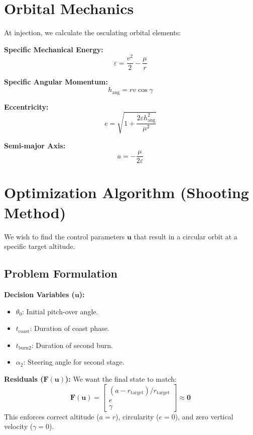 \documentclass[11pt]{article}
\begin{document}
\section{Orbital Mechanics}
\label{sec:orbit}
At injection, we calculate the osculating orbital elements:

\textbf{Specific Mechanical Energy:}
\begin{equation}
    \label{eq:energy}
    \varepsilon = \frac{v^2}{2} - \frac{\mu}{r}
\end{equation}

\textbf{Specific Angular Momentum:}
\begin{equation}
    \label{eq:ang_mom}
    h_{\text{ang}} = r v \cos\gamma
\end{equation}

\textbf{Eccentricity:}
\begin{equation}
    \label{eq:eccentricity}
    e = \sqrt{1 + \frac{2 \varepsilon h_{\text{ang}}^2}{\mu^2}}
\end{equation}

\textbf{Semi-major Axis:}
\begin{equation}
    \label{eq:semi_major}
    a = - \frac{\mu}{2 \varepsilon}
\end{equation}

\section{Optimization Algorithm (Shooting Method)}
\label{sec:optimization}

We wish to find the control parameters $\bm{u}$ that result in a circular orbit at a specific target altitude.

\subsection{Problem Formulation}
\textbf{Decision Variables ($\bm{u}$):}
\begin{itemize}
    \item $\theta_0$: Initial pitch-over angle.
    \item $t_{\text{coast}}$: Duration of coast phase.
    \item $t_{\text{burn2}}$: Duration of second burn.
    \item $\alpha_2$: Steering angle for second stage.
\end{itemize}

\textbf{Residuals ($\bm{F}(\bm{u})$):}
We want the final state to match:
\begin{equation}
    \label{eq:residuals}
    \bm{F}(\bm{u}) = \begin{bmatrix}
        (a - r_{\text{target}}) / r_{\text{target}} \\
        e \\
        \gamma
    \end{bmatrix} \approx \bm{0}
\end{equation}
This enforces correct altitude ($a=r$), circularity ($e=0$), and zero vertical velocity ($\gamma=0$).
\end{document}

